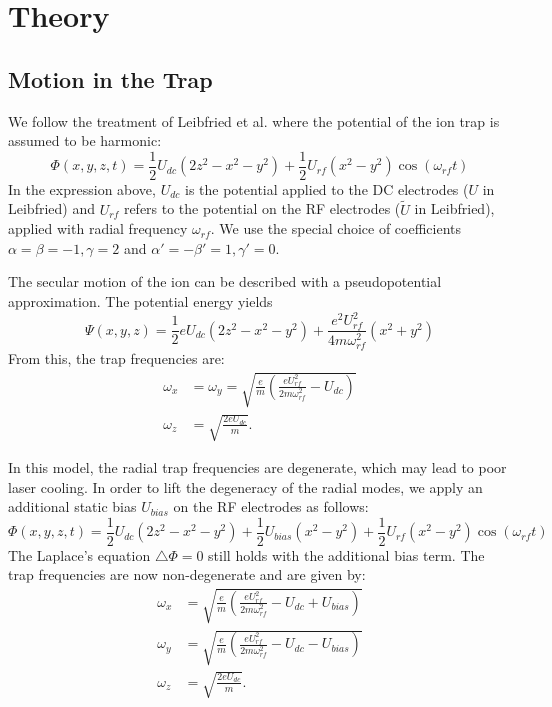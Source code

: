 \documentclass[a4paper,10pt]{article}
\begin{document}
\section{Theory}

\subsection{Motion in the Trap}

We follow the treatment of Leibfried et al. where the potential of the ion trap is assumed to be harmonic:
\begin{equation}
 \Phi(x,y,z,t) = \frac{1}{2} U_{dc}(2z^2 - x^2 - y^2) + \frac{1}{2}U_{rf}(x^2 - y^2)\cos (\omega_{rf} t)
\end{equation}
In the expression above, $U_{dc}$ is the potential applied to the DC electrodes ($U$ in Leibfried) and $U_{rf}$ refers to the potential on the RF electrodes ($\tilde{U}$ in Leibfried), applied with radial frequency $\omega_{rf}$. We use the special choice of coefficients $\alpha=\beta=-1, \gamma=2$ and $\alpha'=-\beta'=1, \gamma'=0$.

The secular motion of the ion can be described with a pseudopotential approximation. The potential energy yields
\begin{equation}
 \Psi(x,y,z) =  \frac{1}{2}eU_{dc}(2z^2 - x^2 - y^2) + \frac{e^2U_{rf}^2}{4 m \omega_{rf}^2} (x^2 + y^2)
\end{equation}
From this, the trap frequencies are:
\begin{align}
 \omega_x &= \omega_y = \sqrt{\frac{e}{m}\left(\frac{e U_{rf}^2}{2m\omega_{rf}^2}-U_{dc} \right)}\\
 \omega_z &= \sqrt{\frac{2eU_{dc}}{m}}.
\end{align}

In this model, the radial trap frequencies are degenerate, which may lead to poor laser cooling. In order to lift the degeneracy of the radial modes, we
apply an additional static bias $U_{bias}$ on the RF electrodes as follows:
\begin{equation}
 \Phi(x,y,z,t) = \frac{1}{2} U_{dc}(2z^2 - x^2 - y^2) + \frac{1}{2}U_{bias}(x^2 - y^2) + \frac{1}{2}U_{rf}(x^2 - y^2)\cos (\omega_{rf} t)
\end{equation}
The Laplace's equation $\triangle\Phi= 0$ still holds with the additional bias term. The trap frequencies are now non-degenerate and are given by:
\begin{align}
 \omega_x &= \sqrt{\frac{e}{m}\left(\frac{e U_{rf}^2}{2m\omega_{rf}^2}-U_{dc} +U_{bias}\right)}\\
 \omega_y &= \sqrt{\frac{e}{m}\left(\frac{e U_{rf}^2}{2m\omega_{rf}^2}-U_{dc} -U_{bias}\right)}\\
 \omega_z &= \sqrt{\frac{2eU_{dc}}{m}}.
\end{align}
\end{document}
